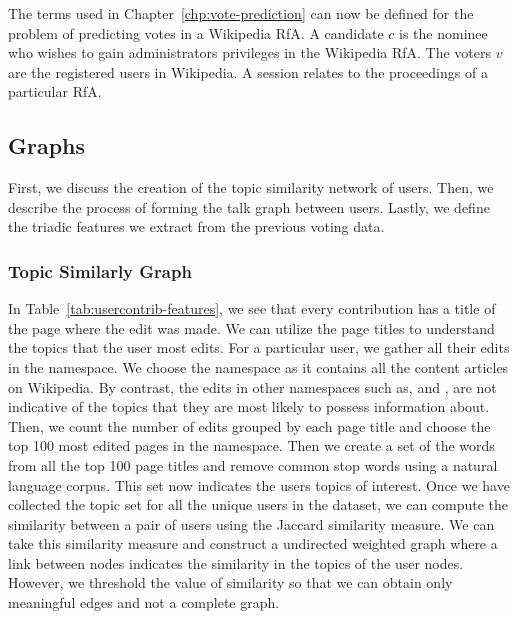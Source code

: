 The terms used in Chapter~\ref{chp:vote-prediction} can now be defined for the problem of predicting votes in a Wikipedia RfA.
A candidate $c$ is the nominee who wishes to gain administrators privileges in the Wikipedia RfA.
The voters $v$ are the registered users in Wikipedia.
A session relates to the proceedings of a particular RfA.
\subsection{Graphs}
First, we discuss the creation of the topic similarity network of users.
Then, we describe the process of forming the talk graph between users.
Lastly, we define the triadic features we extract from the previous voting data. 

\subsubsection{Topic Similarly Graph}
In Table~\ref{tab:usercontrib-features}, we see that every contribution has a title of the page where the edit was made.
We can utilize the page titles to understand the topics that the user most edits.
For a particular user, we gather all their edits in the \mainNS namespace.
We choose the \mainNS namespace as it contains all the content articles on Wikipedia.
By contrast, the edits in other namespaces such as, \userNS and \helpNS, are not indicative of the topics that they are most likely to possess information about.
Then, we count the number of edits grouped by each page title and choose the top 100 most edited pages in the \mainNS namespace.
Then we create a set of the words from all the top 100 page titles and remove common stop words using a natural language corpus.
This set now indicates the users topics of interest.
Once we have collected the topic set for all the unique users in the \wikirfa dataset, we can compute the similarity between a pair of users using the Jaccard similarity measure. 
We can take this similarity measure and construct a undirected weighted graph where a link between nodes indicates the similarity in the topics of the user nodes.
However, we threshold the value of similarity so that we can obtain only meaningful edges and not a complete graph.

